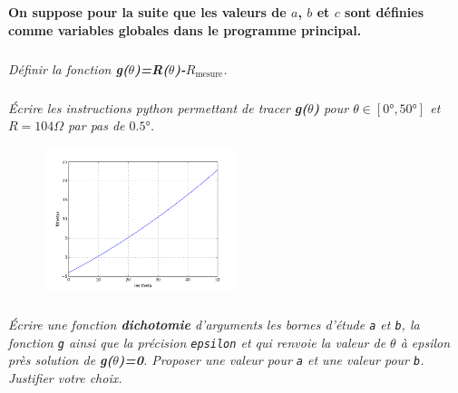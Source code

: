 \documentclass[10pt,fleqn]{article} %
\begin{document}
\textbf{On suppose pour la suite que les valeurs de $a$, $b$ et $c$ sont définies comme 
variables globales dans le programme principal.} \\

\subparagraph{}
\textit{Définir la fonction \textbf{g($\theta$)=R($\theta$)-$R_{\text{mesure}}$}.}

\ifprof
\begin{corrige}
\end{corrige}
\else
\fi

\subparagraph{}
\textit{Écrire les instructions python permettant de tracer \textbf{g($\theta$)} pour $\theta\in[0°,50°]$ et $R=104\Omega$ par pas de $0.5°$.}

\ifprof
\begin{corrige}
\end{corrige}
\else
\fi

\begin{figure}[h]
	\centering
		\includegraphics[width=0.5\textwidth]{images/courbe.png}
\end{figure}

\subparagraph{}
\textit{Écrire une fonction \textbf{dichotomie} d'arguments les bornes d'étude \texttt{a} et \texttt{b}, la fonction \texttt{g} ainsi que la précision \texttt{epsilon} et qui renvoie la valeur de $\theta$ à epsilon près solution de \textbf{g($\theta$)=0}. Proposer une valeur pour \texttt{a} et une valeur pour \texttt{b}. Justifier votre choix.}

\ifprof
\begin{corrige}
\end{corrige}
\else
\fi
\end{document}
